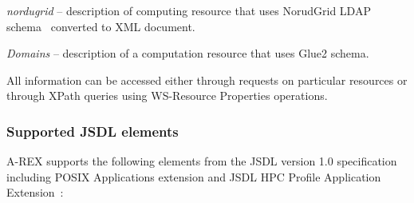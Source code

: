 \documentclass{article}                            %
\begin{document}
\begin{list}{--}{\setlength{\labelwidth}{0.5cm}\setlength{\rightmargin}{\leftmargin}}
\item [{\emph{nordugrid}}] -- description of computing resource that uses
NorudGrid LDAP schema~\cite{is} converted to XML document.
\item [{\emph{Domains}}] -- description of a computation resource
that uses Glue2 schema.
\end{list}
All information can be accessed either through requests on particular
resources or through XPath queries using WS-Resource Properties operations.

\subsubsection{Supported JSDL elements}

A-REX supports the following elements from the JSDL version 1.0 specification~\cite{jsdl}
including POSIX Applications extension and JSDL HPC Profile Application
Extension~\cite{jsdl-hpc}:
\end{document}
